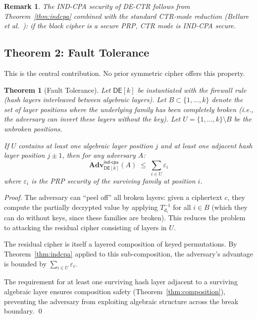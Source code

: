 \documentclass[11pt]{article}
\newtheorem{theorem}{Theorem}
\newtheorem{remark}{Remark}
\newcommand{\DE}{\textsf{DE}}
\newcommand{\Adv}{\mathbf{Adv}}
\begin{document}
\begin{remark}
The IND-CPA security of DE-CTR follows from Theorem~\ref{thm:indcpa}
combined with the standard CTR-mode reduction (Bellare et
al.~\cite{bellare1997}): if the block cipher is a secure PRP, CTR mode
is IND-CPA secure.
\end{remark}

\subsection{Theorem 2: Fault Tolerance}

This is the central contribution. No prior symmetric cipher offers this
property.

\begin{theorem}[Fault Tolerance]
\label{thm:fault-tolerance}
Let $\DE[k]$ be instantiated with the firewall rule (hash layers interleaved
between algebraic layers). Let $B \subset \{1, \ldots, k\}$ denote the set
of layer positions where the underlying family has been \emph{completely
broken} (i.e., the adversary can invert these layers without the key). Let
$U = \{1, \ldots, k\} \setminus B$ be the unbroken positions.

If $U$ contains at least one algebraic layer position $j$ and at least one
adjacent hash layer position $j \pm 1$, then for any adversary $A$:
\[
\Adv^{\textsf{ind-cpa}}_{\DE[k]}(A) \;\leq\; \sum_{i \in U} \varepsilon_i
\]
where $\varepsilon_i$ is the PRP security of the surviving family at position $i$.
\end{theorem}

\begin{proof}
The adversary can ``peel off'' all broken layers: given a ciphertext $c$,
they compute the partially decrypted value by applying $T_{d_i}^{-1}$ for
all $i \in B$ (which they can do without keys, since these families are
broken). This reduces the problem to attacking the residual cipher
consisting of layers in $U$.

The residual cipher is itself a layered composition of keyed permutations.
By Theorem~\ref{thm:indcpa} applied to this sub-composition, the adversary's
advantage is bounded by $\sum_{i \in U} \varepsilon_i$.

The requirement for at least one surviving hash layer adjacent to a
surviving algebraic layer ensures composition safety
(Theorem~\ref{thm:composition}), preventing the adversary from exploiting
algebraic structure across the break boundary. \qed
\end{proof}
\end{document}
